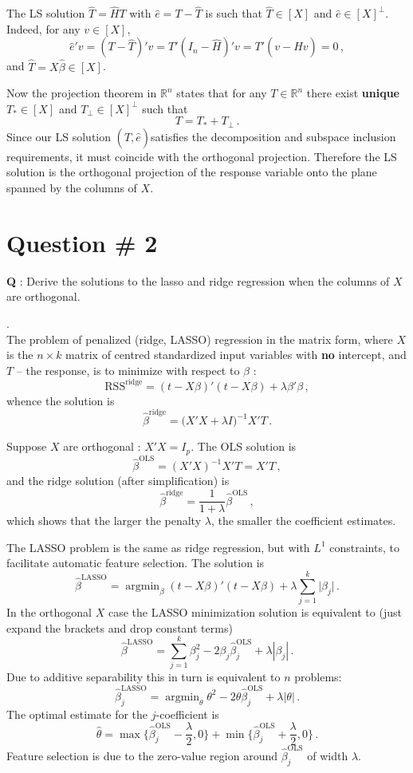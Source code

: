 \documentclass[a4paper]{article}
\newcommand{\Real}{\mathbb{R}}
\newcommand{\argmin}{\mathop{\text{argmin}}}
\newcommand{\RSS}{{\text{RSS}}}
\begin{document}
The LS solution $\hat{T} = \hat{H}T$ with $\hat{e} = T - \hat{T}$ is such that 
$\hat{T}\in [X]$ and $\hat{e} \in [X]^\perp$. Indeed, for any $v\in [X]$, 
\[ \hat{e}'v = (T - \hat{T})'v = T'(I_n - \hat{H})'v = T'( v - \hat{H}v) = 0\,, \]
and $\hat{T} = X \hat{\beta} \in [X]$.

Now the projection theorem in $\Real^n$ states that for any $T\in \Real^n$ there
exist \textbf{unique} $T_*\in [X]$ and $T_\perp \in [X]^\perp$ such that
\[ T = T_* + T_\perp \,. \]
Since our LS solution $(\hat{T}, \hat{e})$satisfies the decomposition and subspace
inclusion requirements, it must coincide with the orthogonal projection. Therefore
the LS solution is the orthogonal projection of the response variable onto the plane
spanned by the columns of $X$.

\clearpage

\section[LASSO and Ridge]{Question \# 2} %
\label{sec:question_2}
\textbf{\large \textbf{Q}} : Derive the solutions to the lasso and ridge regression
when the columns of $X$ are orthogonal.

 .\hfill\\
The problem of penalized (ridge, LASSO) regression in the matrix form, where $X$
is the $n\times k$ matrix of centred standardized input variables with \textbf{no}
intercept, and $T$ -- the response, is to minimize with respect to $\beta$ :
\[ \RSS^{\text{ridge}} = (t-X\beta)'(t-X\beta) + \lambda \beta'\beta \,, \]
whence the solution is
\[ \hat{\beta}^{\text{ridge}} = \bigl(X'X + \lambda I\bigr)^{-1} X'T \,. \]

Suppose $X$ are orthogonal : $X'X = I_p$. The OLS solution is
\[ \hat{\beta}^{\text{OLS}} = (X'X)^{-1} X'T = X'T \,, \]
and the ridge solution (after simplification) is 
\[
\hat{\beta}^{\text{ridge}} = \frac{1}{1+\lambda} \hat{\beta}^{\text{OLS}}\,,
\]
which shows that the larger the penalty $\lambda$, the smaller the coefficient estimates.

The LASSO problem is the same as ridge regression, but with $L^1$ constraints, to
facilitate automatic feature selection. The solution is
\[
\hat{\beta}^{\text{LASSO}}
= \argmin_\beta (t-X\beta)'(t-X\beta) + \lambda \sum_{j=1}^k \lvert \beta_j\rvert \,.
\]
In the orthogonal $X$ case the LASSO minimization solution is equivalent to (just
expand the brackets and drop constant terms)
\[
\hat{\beta}^{\text{LASSO}}
= \sum_{j=1}^k \beta_j^2 - 2 \beta_j \hat{\beta}^{\text{OLS}}_j + \lambda |\beta_j|\,.
\]
Due to additive separability this in turn is equivalent to $n$ problems:
\[
\hat{\beta}^{\text{LASSO}}_j
= \argmin_{\theta} \theta^2 - 2 \theta \hat{\beta}^{\text{OLS}}_j + \lambda |\theta|\,.
\]
The optimal estimate for the $j$-coefficient is
\[
\hat{\theta}
= \max\bigl\{ \hat{\beta}^{\text{OLS}}_j - \frac{\lambda}{2}, 0 \bigr\}
+ \min\bigl\{ \hat{\beta}^{\text{OLS}}_j + \frac{\lambda}{2}, 0 \bigr\}\,.
\]
Feature selection is due to the zero-value region around $\hat{\beta}^{\text{OLS}}_j$
of width $\lambda$.
\end{document}
